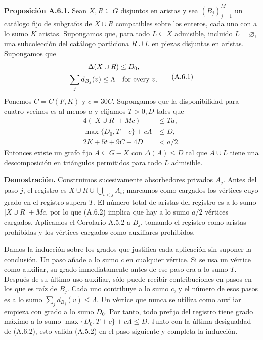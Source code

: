 \documentclass[spanish,11pt,a4paper]{article}
\begin{document}
\textbf{Proposición A.6.1.} Sean \(X,R\subseteq G\) disjuntos en aristas y sea \((B_j)_{j=1}^M\) un catálogo fijo de subgrafos de \(X\cup R\) compatibles sobre los enteros, cada uno con a lo sumo \(K\) aristas. Supongamos que, para todo \(L\subseteq X\) admisible, incluido \(L=\varnothing\), una subcolección del catálogo particiona \(R\cup L\) en piezas disjuntas en aristas. Supongamos que \[\begin{gathered}
\Delta(X\cup R)\le D_0,\\
\sum_j d_{B_j}(v)\le\Lambda\quad\hbox{for every }v.
\end{gathered}
\tag{A.6.1}\] Ponemos \(C=C(F,K)\) y \(c=30C\). Supongamos que la disponibilidad para cuatro vecinos es al menos \(a\) y elijamos \(T>0,D\) tales que \[\begin{split}
4(|X\cup R|+Mc)&\le Ta,\\
\max\{D_0,T+c\}+c\Lambda&\le D,\\
2K+5t+9C+4D&<a/2.
\end{split}
\tag{A.6.2}\] Entonces existe un grafo fijo \(A\subseteq G-X\) con \(\Delta(A)\le D\) tal que \(A\cup L\) tiene una descomposición en triángulos permitidos para todo \(L\) admisible.

\textbf{Demostración.} Construimos sucesivamente absorbedores privados \(A_j\). Antes del paso \(j\), el registro es \(X\cup R\cup\bigcup_{i<j}A_i\); marcamos como cargados los vértices cuyo grado en el registro supera \(T\). El número total de aristas del registro es a lo sumo \(|X\cup R|+Mc\), por lo que (A.6.2) implica que hay a lo sumo \(a/2\) vértices cargados. Aplicamos el Corolario A.5.2 a \(B_j\), tomando el registro como aristas prohibidas y los vértices cargados como auxiliares prohibidos.

Damos la inducción sobre los grados que justifica cada aplicación sin suponer la conclusión. Un paso añade a lo sumo \(c\) en cualquier vértice. Si se usa un vértice como auxiliar, su grado inmediatamente antes de ese paso era a lo sumo \(T\). Después de su último uso auxiliar, sólo puede recibir contribuciones en pasos en los que es raíz de \(B_j\). Cada uno contribuye a lo sumo \(c\), y el número de esos pasos es a lo sumo \(\sum_j d_{B_j}(v)\le\Lambda\). Un vértice que nunca se utiliza como auxiliar empieza con grado a lo sumo \(D_0\). Por tanto, todo prefijo del registro tiene grado máximo a lo sumo \(\max\{D_0,T+c\}+c\Lambda\le D\). Junto con la última desigualdad de (A.6.2), esto valida (A.5.2) en el paso siguiente y completa la inducción.
\end{document}

